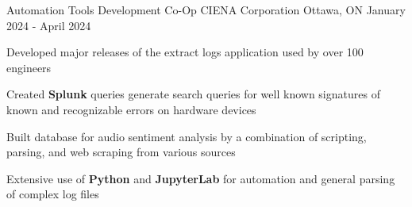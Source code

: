 

\begin{cventries}




	\cventry
	{Automation Tools Development Co-Op} %
	{CIENA Corporation} %
	{Ottawa, ON} %
	{January 2024 - April 2024} %
	{
		\begin{cvitems} %
			\item {Developed major releases of the extract logs application used by over 100 engineers}
			\item {Created \textbf{Splunk} queries generate search queries for well known signatures of known and recognizable errors on hardware devices}
      \item {Built database for audio sentiment analysis by a combination of scripting, parsing, and web scraping from various sources}
			\item {Extensive use of \textbf{Python} and \textbf{JupyterLab} for automation and general parsing of complex log files}
		\end{cvitems}
	}


\end{cventries}
